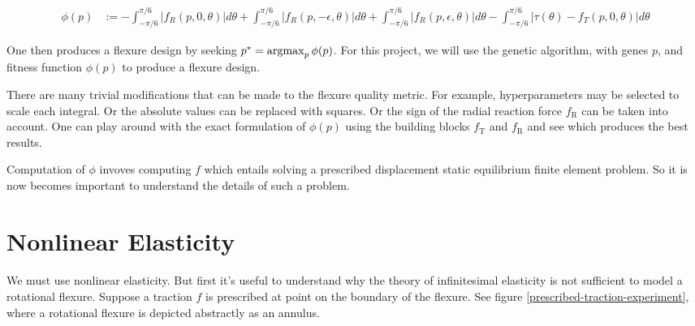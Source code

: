 \documentclass[11pt,letterpaper]{article}
\begin{document}
\[\begin{aligned}
    \phi(p) &:=  -\int_{-\pi/6}^{\pi/6} |f_{R}(p, 0, \theta)| d\theta + \int_{-\pi/6}^{\pi/6} |f_{R}(p, - \epsilon, \theta) | d\theta + \int_{-\pi/6}^{\pi/6} |f_{R}(p, \epsilon, \theta)| d\theta 
- \int_{-\pi/6}^{\pi/6} |\tau(\theta)  - f_T(p, 0, \theta)|d\theta
  \end{aligned}
\]

One then produces a flexure design by seeking $p^* = \mathop{\rm argmax}_p \phi(p)$. For this project, we will use the genetic algorithm, with genes $p$, and fitness function $\phi(p)$ to produce a flexure design.

There are many trivial modifications that can be made to the flexure quality metric. For example, hyperparameters may be selected to scale each integral. Or the absolute values can be replaced with squares. Or the sign of the radial reaction force $f_\text{R}$ can be taken into account. One can play around with the exact formulation of $\phi(p)$ using the building blocks $f_\text{T}$ and $f_\text{R}$ and see which produces the best results. 

Computation of $\phi$ invoves computing $f$ which entails solving a prescribed displacement static equilibrium finite element problem. So it is now becomes important to understand the details of such a problem.
\newpage

\section{Nonlinear Elasticity}
\paragraph{}
We must use nonlinear elasticity. But first it's useful to understand why the theory of infinitesimal elasticity is not sufficient to model a rotational flexure. Suppose a traction $f$ is prescribed at point on the boundary of the flexure. See figure \ref{prescribed-traction-experiment}, where a rotational flexure is depicted abstractly as an annulus.
\end{document}
